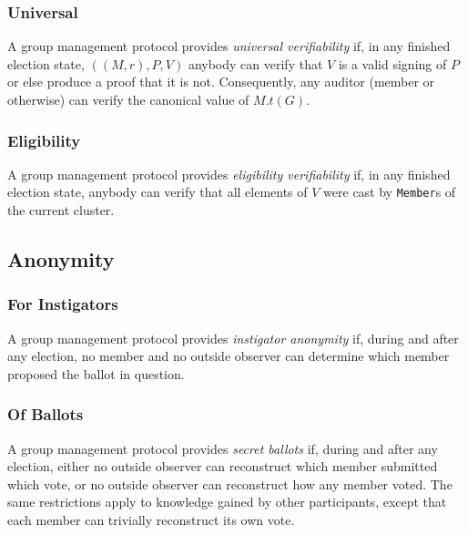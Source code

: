     \subsubsection{Universal}
    A group management protocol provides \emph{universal verifiability} if, in
    any finished election state, $((M,r), P, V)$%
    anybody can verify that $V$ is a valid signing of $P$ or else produce a
    proof that it is not. Consequently, any auditor (member or otherwise) can
    verify the canonical value of $M.t(G)$.


    \subsubsection{Eligibility}
    A group management protocol provides \emph{eligibility verifiability} if, in
    any finished election state, anybody can verify that all elements of $V$
    were cast by \texttt{Member}s of the current cluster.
  \subsection{Anonymity}
    \subsubsection{For Instigators}
    A group management protocol provides \emph{instigator anonymity} if, during
    and after any election, no member and no outside observer can determine
    which member proposed the ballot in question.

    \subsubsection{Of Ballots}
    A group management protocol provides \emph{secret ballots} if, during and
    after any election, either no outside observer can reconstruct which member
    submitted which vote, or no outside observer can reconstruct how any
    member voted. The same restrictions apply to knowledge gained by other
    participants, except that each member can trivially reconstruct its own vote.

%
